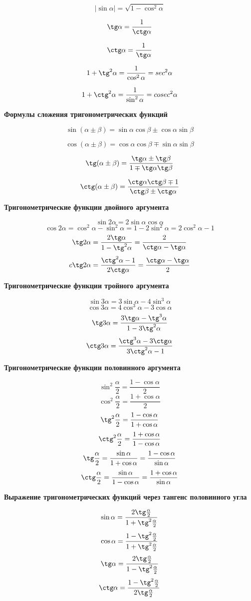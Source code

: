 \documentclass[a5paper, 8pt]{extarticle}
\begin{document}
$$|\sin \alpha |=\sqrt{1-\cos^2\alpha}$$

$$\tg\alpha = \frac{1}{\ctg\alpha}$$

$$\ctg\alpha = \frac{1}{\tg\alpha}$$

$$1+\tg^2\alpha =\frac{1}{\cos^2\alpha}=sec^2\alpha$$

$$1+\ctg^2\alpha =\frac{1}{\sin^2\alpha}=cosec^2\alpha$$

\textbf{Формулы сложения тригонометрических функций}

$$\sin(\alpha \pm \beta )=\sin \alpha \cos \beta \pm \cos \alpha \sin \beta $$

$$\cos(\alpha \pm \beta )=\cos \alpha \cos\beta \mp \sin\alpha\sin\beta$$

$$\tg(\alpha\pm\beta)=\frac{\tg\alpha\pm\tg\beta}{1\mp\tg\alpha\tg\beta}$$

$$\ctg(\alpha\pm\beta)=\frac{\ctg\alpha\ctg\beta\mp1}{\ctg\beta\pm\ctg\alpha}$$

\textbf{Тригонометрические функции двойного аргумента}

$$\sin2\alpha=2\sin\alpha\cos\alpha$$
$$\cos2\alpha=\cos^2\alpha-\sin^2\alpha=1-2\sin^2\alpha=2\cos^2\alpha-1$$
$$\tg2\alpha=\frac{2\tg\alpha}{1-\tg^2\alpha}=\frac{2}{\ctg\alpha-\tg\alpha}$$
$$c\tg2\alpha=\frac{\ctg^2\alpha-1}{2\ctg\alpha}=\frac{\ctg\alpha-\tg\alpha}{2}$$

\textbf{Тригонометрические функции тройного аргумента}

$$\sin3\alpha=3\sin\alpha-4\sin^3\alpha$$
$$\cos3\alpha=4\cos^3\alpha - 3\cos\alpha$$
$$\tg3\alpha=\frac{3\tg\alpha-\tg^3\alpha}{1-3\tg^2\alpha}$$
$$\ctg3\alpha=\frac{\ctg^3\alpha-3\ctg\alpha}{3\ctg^2\alpha-1}$$

\textbf{Тригонометрические функции половинного аргумента}

$$\sin^2\frac{\alpha}{2}=\frac{1-\cos\alpha}{2}$$
$$\cos^2\frac{\alpha}{2}=\frac{1+\cos\alpha}{2}$$
$$\tg^2\frac{\alpha}{2}=\frac{1-\cos\alpha}{1+\cos\alpha}$$
$$\ctg^2\frac{\alpha}{2}=\frac{1+\cos\alpha}{1-\cos\alpha}$$
$$\tg\frac{\alpha}{2}=\frac{\sin\alpha}{1+\cos\alpha}=\frac{1-\cos\alpha}{\sin\alpha}$$
$$\ctg\frac{\alpha}{2}=\frac{\sin\alpha}{1-\cos\alpha}=\frac{1+\cos\alpha}{\sin\alpha}$$

\textbf{Выражение тригонометрических функций через тангенс половинного угла}

$$\sin\alpha=\frac{2\tg\frac{\alpha}{2}}{1+\tg^2\frac{\alpha}{2}}$$
$$\cos\alpha=\frac{1-\tg^2\frac{\alpha}{2}}{1+\tg^2\frac{\alpha}{2}}$$
$$\tg\alpha=\frac{2\tg\frac{\alpha}{2}}{1-\tg^2\frac{\alpha}{2}}$$
$$\ctg\alpha=\frac{1-\tg^2\frac{\alpha}{2}}{2\tg\frac{\alpha}{2}}$$
\end{document}
